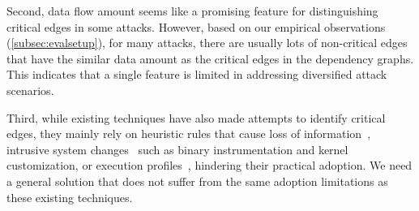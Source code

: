 Second, data flow amount seems like a promising feature for distinguishing critical edges in some attacks.
However, based on our empirical observations (\cref{subsec:evalsetup}), for many attacks, there are usually lots of non-critical edges that have the similar data amount as the critical edges in the dependency graphs.
This indicates that a single feature is limited in addressing diversified attack scenarios. 


Third, while existing techniques have also made attempts to identify critical edges, they mainly rely on heuristic rules that cause loss of information~\cite{backtracking}, intrusive system changes~\cite{ma2016protracer,mcitracking} such as binary instrumentation and kernel customization, or execution profiles~\cite{hassan2019nodoze}, hindering their practical adoption. 
We need a general solution that does not suffer from the same adoption limitations as these existing techniques.



